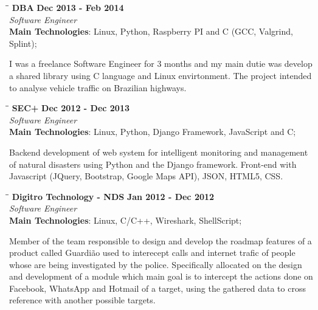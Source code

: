 \documentclass[margin]{res}
\begin{document}
\begin{resume}
\vspace{-0.1in}

\vspace{-0.1in}
   \begin{tabbing}
   \hspace{2.3in}\= \hspace{1.7in}\= \kill %
    \textbf{DBA}    \>\>\textbf{Dec 2013 - Feb 2014}\\
    \textit{Software Engineer}\\        
    \textbf{Main Technologies}: Linux, Python, Raspberry PI and C (GCC, Valgrind, Splint);
   \end{tabbing}\vspace{-20pt}      %
    \vspace{2mm}
        I was a freelance Software Engineer for 3 months and my main dutie was develop
        a shared library using C language and Linux envirtonment. The project intended to 
        analyse vehicle traffic on Brazilian highways.
\vspace{-0.1in}

   \begin{tabbing}
   \hspace{2.3in}\= \hspace{1.7in}\= \kill %
    \textbf{SEC+}    \>\>\textbf{Dec 2012 - Dec 2013}\\
    \textit{Software Engineer}\\        
    \textbf{Main Technologies}: Linux, Python, Django Framework, JavaScript and C;
   \end{tabbing}\vspace{-20pt}      %
    \vspace{2mm}
     Backend development of web system for intelligent monitoring and management of natural disasters
     using Python and the Django framework. Front-end with Javascript (JQuery, Bootstrap, Google Maps API),
     JSON, HTML5, CSS.

   \begin{tabbing}
   \hspace{2.3in}\= \hspace{1.7in}\= \kill %
    \textbf{Digitro Technology - NDS}    \>\>\textbf{Jan 2012 - Dec 2012}\\
    \textit{Software Engineer}\\   
    \textbf{Main Technologies}: Linux, C/C++, Wireshark, ShellScript;
   \end{tabbing}\vspace{-20pt}      %
    \vspace{2mm}
    Member of the team responsible to design and develop the roadmap features of a product called
    Guardião used to interecept calls and internet trafic of people whose are being investigated by the police. 
    Specifically allocated on the design and development of a module which main goal is to intercept the actions 
    done on Facebook, WhatsApp and Hotmail of a target, using the gathered data to cross reference with another
    possible targets.
   

\end{resume}
\end{document}
